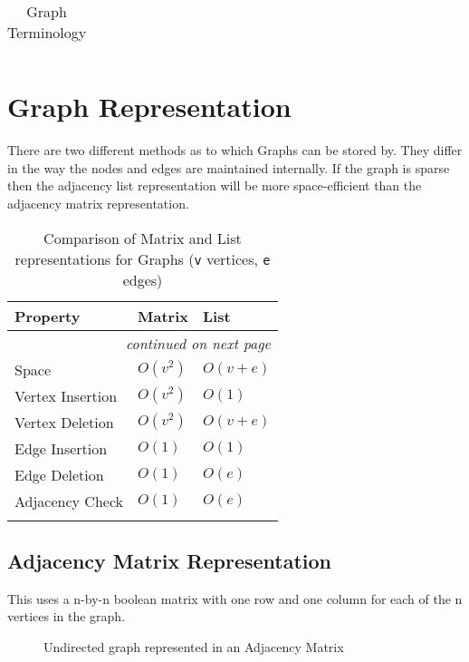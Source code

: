 {\begin{longtable}{p{} p{}}
    \caption{Graph Terminology}
    \end{longtable}
} %

\section{Graph Representation}
There are two different methods as to which Graphs can be stored by. They differ in the way the nodes and edges are maintained internally. If the graph is sparse then the adjacency list representation will be more space-efficient than the adjacency matrix representation. 

{\RaggedRight \centering
    \begin{longtable}{p{} p{} p{}}
    \textbf{Property} & \textbf{Matrix} & \textbf{List}\\
    \hline
    \hline
    \endhead

    \multicolumn{3}{r}{\footnotesize\itshape continued on next page}\\
    \endfoot 

    \endlastfoot

    Space & $O(v^2)$ & $O(v+e)$\\
    \hline
    Vertex Insertion & $O(v^2)$ & $O(1)$\\
    \hline
    Vertex Deletion & $O(v^2)$ & $O(v+e)$\\
    \hline
    Edge Insertion & $O(1)$ & $O(1)$\\
    \hline
    Edge Deletion & $O(1)$ & $O(e)$\\
    \hline
    Adjacency Check & $O(1)$ & $O(e)$\\
    \hline
    
    \caption{Comparison of Matrix and List representations for Graphs (\texttt{v} vertices, \texttt{e} edges)}
    \end{longtable}
} %

\subsection{Adjacency Matrix Representation}
This uses a n-by-n boolean matrix with one row and one column for each of the n vertices in the graph.
\begin{figure}[H]
    \centering
    
    \caption{Undirected graph represented in an Adjacency Matrix}
\end{figure}

